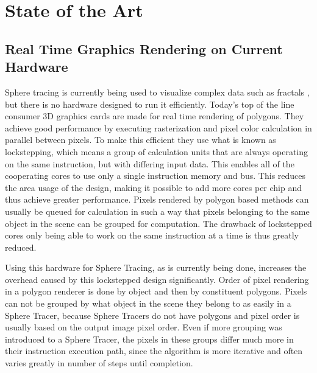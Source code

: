 \chapter{State of the Art}

	\section{ Real Time Graphics Rendering on Current Hardware } 

		Sphere tracing is currently being used to visualize complex data such
		as fractals \cite{granskog2017}, but there is no hardware designed to
		run it efficiently.  Today's top of the line consumer 3D graphics cards
		are made for real time rendering of polygons\cite{Houston2010}. They achieve good
		performance by executing rasterization and pixel color calculation in
		parallel between pixels. To make this efficient they use what is known
		as lockstepping, which means a group of calculation units that are
		always operating on the same instruction, but with differing input
		data. This enables all of the cooperating cores to use only a single
		instruction memory and bus. This reduces the area usage of the design,
		making it possible to add more cores per chip and thus achieve greater
		performance. Pixels rendered by polygon based methods can usually be
		queued for calculation in such a way that pixels belonging to the same
		object in the scene can be grouped for computation. The drawback of
		lockstepped cores only being able to work on the same instruction at a
		time is thus greatly reduced.
		
		Using this hardware for Sphere Tracing, as is currently being done,
		increases the overhead caused by this lockstepped design significantly.
		Order of pixel rendering in a polygon renderer is done by object and
		then by constituent polygons. Pixels can not be grouped by what object
		in the scene they belong to as easily in a Sphere Tracer, because Sphere
		Tracers do not have polygons and pixel order is usually based on the
		output image pixel order. Even if more grouping was introduced to a
		Sphere Tracer, the pixels in these groups differ much more in their
		instruction execution path, since the algorithm is more iterative and
		often varies greatly in number of steps until completion.

